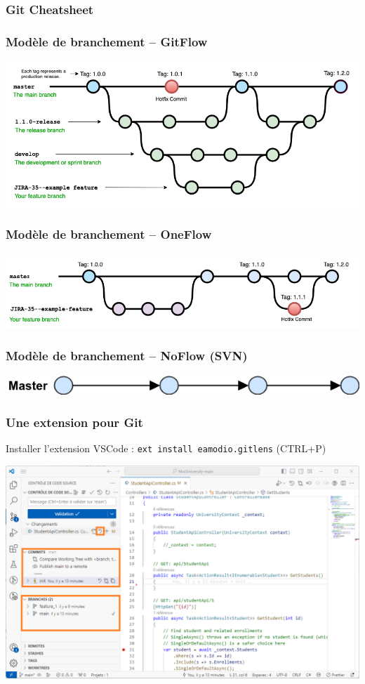 \begin{frame}
    \frametitle{Git Cheatsheet}
    \centering

\end{frame}

\begin{frame}
    \frametitle{Modèle de branchement -- GitFlow}
    \centering
    \includegraphics[width=\linewidth]{figures/environnement/git-branching-gitflow}
\end{frame}

\begin{frame}
    \frametitle{Modèle de branchement -- OneFlow}
    \centering
    \includegraphics[width=\linewidth]{figures/environnement/git-branching-oneflow}
\end{frame}

\begin{frame}
    \frametitle{Modèle de branchement -- NoFlow (SVN)}
    \centering
    \includegraphics[width=0.7\linewidth]{figures/environnement/git-branching-noflow}
\end{frame}

\begin{frame}
    \frametitle{Une extension pour Git}
    \centering
    \normalsize Installer l'extension VSCode : \texttt{ext install eamodio.gitlens} (CTRL+P)

    \includegraphics[height=0.4\linewidth]{figures/environnement/git-lens}
\end{frame}
